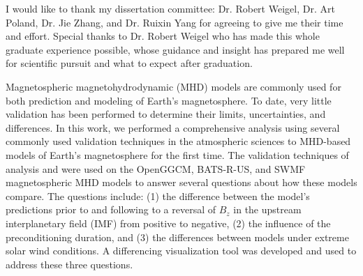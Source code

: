 \documentclass[11 pt]{report}
\begin{document}

\acknowledgementspage

\noindent I would like to thank my dissertation committee: Dr. Robert Weigel,
Dr. Art Poland, Dr. Jie Zhang, and Dr. Ruixin Yang for agreeing to give me their
time and effort. Special thanks to Dr. Robert Weigel who has made this whole
graduate experience possible, whose guidance and insight has prepared
me well for scientific pursuit and what to expect after graduation.


\tableofcontents

\listoftables

\listoffigures

\abstractpage

Magnetospheric magnetohydrodynamic (MHD) models are commonly used for both
prediction and modeling of Earth's magnetosphere.  To date, very little
validation has been performed to determine their limits, uncertainties, and
differences.  In this work,
we performed a comprehensive analysis using several commonly used validation
techniques in the atmospheric sciences to MHD-based models of Earth's
magnetosphere for the first time. The validation techniques of  analysis and  were used on the OpenGGCM, BATS-R-US, and SWMF
magnetospheric MHD models to answer several questions about how these
models compare.  The questions include: (1) the difference between the model's
predictions prior to and following to a reversal of $B_z$ in the upstream
interplanetary field (IMF) from positive to negative, (2) the influence of the
preconditioning duration, and (3) the differences between models under extreme
solar wind conditions. A differencing visualization tool was developed and used to
address these three questions.
\end{document}

